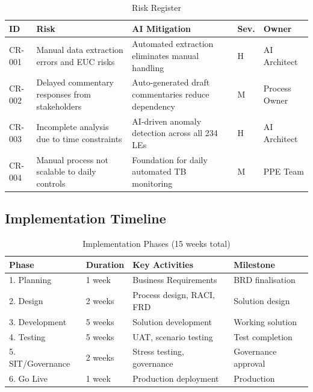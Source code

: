\documentclass[11pt,a4paper]{article}
\begin{document}
\begin{table}[H]
\centering
\caption{Risk Register}
\begin{tabularx}{\textwidth}{lXXlX}
\toprule
\textbf{ID} & \textbf{Risk} & \textbf{AI Mitigation} & \textbf{Sev.} & \textbf{Owner} \\
\midrule
CR-001 & Manual data extraction errors and EUC risks & Automated extraction eliminates manual handling & H & AI Architect \\
CR-002 & Delayed commentary responses from stakeholders & Auto-generated draft commentaries reduce dependency & M & Process Owner \\
CR-003 & Incomplete analysis due to time constraints & AI-driven anomaly detection across all 234 LEs & H & AI Architect \\
CR-004 & Manual process not scalable to daily controls & Foundation for daily automated TB monitoring & M & PPE Team \\
\bottomrule
\end{tabularx}
\end{table}

\subsection{Implementation Timeline}

\begin{table}[H]
\centering
\caption{Implementation Phases (15 weeks total)}
\begin{tabular}{llll}
\toprule
\textbf{Phase} & \textbf{Duration} & \textbf{Key Activities} & \textbf{Milestone} \\
\midrule
1. Planning       & 1 week  & Business Requirements          & BRD finalisation \\
2. Design         & 2 weeks & Process design, RACI, FRD      & Solution design \\
3. Development    & 5 weeks & Solution development           & Working solution \\
4. Testing        & 5 weeks & UAT, scenario testing          & Test completion \\
5. SIT/Governance & 2 weeks & Stress testing, governance     & Governance approval \\
6. Go Live        & 1 week  & Production deployment          & Production \\
\bottomrule
\end{tabular}
\end{table}

\end{document}
